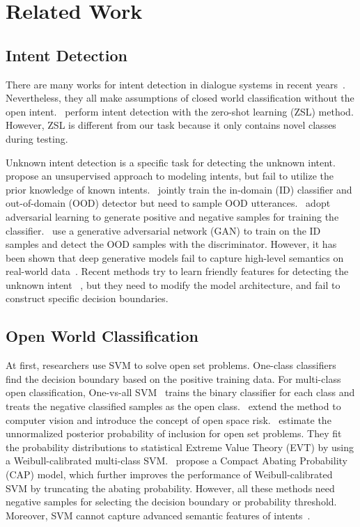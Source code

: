 \documentclass[letterpaper]{article} %
\begin{document}
\section{Related Work}
\subsection{Intent Detection}
There are many works for intent detection in dialogue systems in recent years~\cite{ijcai2020-532,Qin_Che_Li_Ni_Liu_2020,zhang-etal-2019-joint,e-etal-2019-novel,qin-etal-2019-stack}. Nevertheless, they all make assumptions of closed world classification without the open intent.~\citet{srivastava-etal-2018-zero} perform intent detection with the zero-shot learning (ZSL) method. However, ZSL is different from our task because it only contains novel classes during testing.

Unknown intent detection is a specific task for detecting the unknown intent.~\citet{Brychcin2017UnsupervisedDA} propose an unsupervised approach to modeling intents,  but fail to utilize the prior knowledge of known intents.~\citet{Kim2018JointLO} jointly train the in-domain (ID) classifier and out-of-domain (OOD) detector but need to sample OOD utterances.~\citet{Yu2017OpenCategoryCB} adopt adversarial learning to generate positive and negative samples for training the classifier.~\citet{ryu-etal-2018-domain} use a generative adversarial network (GAN) to train on the ID samples and detect the OOD samples with the discriminator. However, it has been shown that deep generative models fail to capture high-level semantics on real-world data~\cite{2018arXiv181009136N,Mundt_2019_ICCV}. Recent methods try to learn friendly features for detecting the unknown intent ~\cite{lin-xu-2019-deep,gangal2020likelihood,yan-etal-2020-unknown}, but they need to modify the  model architecture, and fail to construct specific decision boundaries.

\subsection{Open World Classification}
At first, researchers use SVM to solve open set problems. One-class classifiers~\cite{scholkopf2001estimating,SVDD} find the decision boundary based on the positive training data. For multi-class open classification, One-vs-all SVM~\cite{Rifkin2004In} trains the binary classifier for each class and treats the negative classified samples as the open class.~\citet{scheirer2013toward} extend the method to computer vision and introduce the concept of open space risk.~\citet{Jain_2014_ECCV} estimate the unnormalized posterior probability of inclusion for open set problems. They fit the probability distributions to statistical Extreme Value Theory (EVT) by using a Weibull-calibrated multi-class SVM.~\citet{Scheirer_2014_TPAMIb} propose a Compact Abating Probability (CAP) model, which further improves the performance of Weibull-calibrated SVM by truncating the abating probability. However, all these methods need negative samples for selecting the decision boundary or probability threshold. Moreover, SVM cannot capture  advanced semantic features of intents~\cite{lin2019post}.
\end{document}
